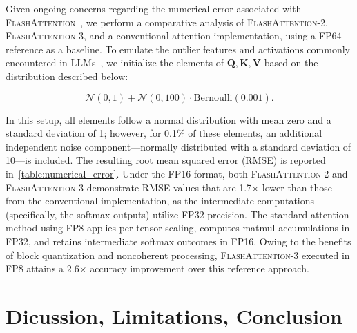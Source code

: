 \begin{itemize}
Given ongoing concerns regarding the numerical error associated with \textsc{FlashAttention}~\citep{golden2024flash}, we perform a comparative analysis of \textsc{FlashAttention-2}, \textsc{FlashAttention-3}, and a conventional attention implementation, using a FP64 reference as a baseline. To emulate the outlier features and activations commonly encountered in LLMs~\citep{dettmers2208llm, sun2024massive}, we initialize the elements of $\mathbf{Q}, \mathbf{K}, \mathbf{V}$ based on the distribution described below:

\begin{equation*}
  \mathcal{N}(0, 1) + \mathcal{N}(0, 100) \cdot \mathrm{Bernoulli}(0.001).
\end{equation*}

In this setup, all elements follow a normal distribution with mean zero and a standard deviation of 1; however, for 0.1\% of these elements, an additional independent noise component—normally distributed with a standard deviation of 10—is included. The resulting root mean squared error (RMSE) is reported in~\cref{table:numerical_error}. Under the FP16 format, both \textsc{FlashAttention-2} and \textsc{FlashAttention-3} demonstrate RMSE values that are 1.7$\times$ lower than those from the conventional implementation, as the intermediate computations (specifically, the softmax outputs) utilize FP32 precision. The standard attention method using FP8 applies per-tensor scaling, computes matmul accumulations in FP32, and retains intermediate softmax outcomes in FP16. Owing to the benefits of block quantization and noncoherent processing, \textsc{FlashAttention-3} executed in FP8 attains a 2.6$\times$ accuracy improvement over this reference approach.

\section{Dicussion, Limitations, Conclusion}
\label{sec:discussion}


\end{itemize}
